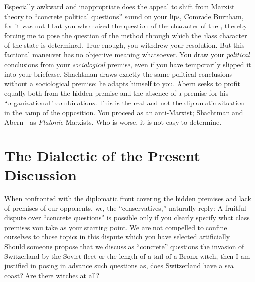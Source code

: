 Especially awkward and inappropriate does the appeal to shift from Marxist theory to “concrete political questions” sound on your lips, Comrade Burnham, for it was not I but you who raised the question of the character of the \USSR, thereby forcing me to pose the question of the method through which the class character of the state is determined. True enough, you withdrew your resolution. But this factional maneuver has no objective meaning whatsoever. You draw your \emph{political} conclusions from your \emph{sociological} premise, even if you have temporarily slipped it into your briefcase. Shachtman draws exactly the same political conclusions without a sociological premise: he adapts himself to you. Abern seeks to profit equally both from the hidden premise and the absence of a premise for his “organizational” combinations. This is the real and not the diplomatic situation in the camp of the opposition. You proceed as an anti-Marxist; Shachtman and Abern---as \emph{Platonic} Marxists. Who is worse, it is not easy to determine.

\section*{The Dialectic of the Present Discussion}

When confronted with the diplomatic front covering the hidden premises and lack of premises of our opponents, we, the “conservatives,” naturally reply: A fruitful dispute over “concrete questions” is possible only if you clearly specify what class premises you take as your starting point. We are not compelled to confine ourselves to those topics in this dispute which you have selected artificially. Should someone propose that we discuss as “concrete” questions the invasion of Switzerland by the Soviet fleet or the length of a tail of a Bronx witch, then I am justified in posing in advance such questions as, does Switzerland have a sea coast? Are there witches at all?

